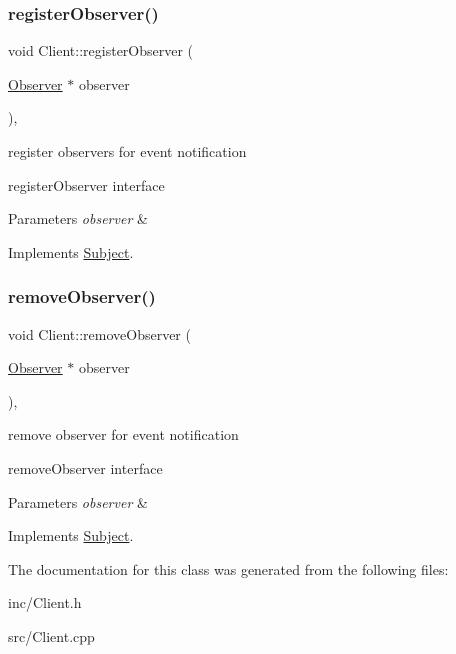 \subsubsection{\texorpdfstring{register\+Observer()}{registerObserver()}}
{\footnotesize\ttfamily void Client\+::register\+Observer (\begin{DoxyParamCaption}\item[{\hyperlink{classObserver}{Observer} $\ast$}]{observer }\end{DoxyParamCaption})\hspace{0.3cm}{\ttfamily [override]}, {\ttfamily [virtual]}}



register observers for event notification 

register\+Observer interface


\begin{DoxyParams}{Parameters}
{\em observer} & \\
\hline
\end{DoxyParams}


Implements \hyperlink{classSubject_ae3f8d320b19b7d0fe695a3b4e7660002}{Subject}.

\mbox{\label{classClient_abfce703b679961b961ff24bbfc532ce4}} 
\subsubsection{\texorpdfstring{remove\+Observer()}{removeObserver()}}
{\footnotesize\ttfamily void Client\+::remove\+Observer (\begin{DoxyParamCaption}\item[{\hyperlink{classObserver}{Observer} $\ast$}]{observer }\end{DoxyParamCaption})\hspace{0.3cm}{\ttfamily [override]}, {\ttfamily [virtual]}}



remove observer for event notification 

remove\+Observer interface


\begin{DoxyParams}{Parameters}
{\em observer} & \\
\hline
\end{DoxyParams}


Implements \hyperlink{classSubject_a86699df0364a9091d1887f344255e9ff}{Subject}.



The documentation for this class was generated from the following files\+:\begin{DoxyCompactItemize}
\item 
inc/Client.\+h\item 
src/Client.\+cpp\end{DoxyCompactItemize}
